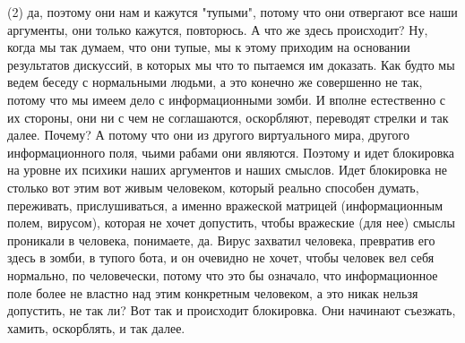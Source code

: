 (2) да, поэтому они нам и кажутся "тупыми", потому что они отвергают все наши
аргументы, они только кажутся, повторюсь. А что же здесь происходит? Ну, когда
мы так думаем, что они тупые, мы к этому приходим на основании результатов
дискуссий, в которых мы что то пытаемся им доказать. Как будто мы ведем беседу
с нормальными людьми, а это конечно же совершенно не так, потому что мы имеем
дело с информационными зомби. И вполне естественно с их стороны, они ни с чем
не соглашаются, оскорбляют, переводят стрелки и так далее. Почему? А потому что
они из другого виртуального мира, другого информационного поля, чьими рабами
они являются. Поэтому и идет блокировка на уровне их психики наших аргументов и
наших смыслов. Идет блокировка не столько вот этим вот живым человеком, который
реально способен думать, переживать, прислушиваться, а именно вражеской
матрицей (информационным полем, вирусом), которая не хочет допустить, чтобы
вражеские (для нее) смыслы проникали в человека, понимаете, да. Вирус захватил
человека, превратив его здесь в зомби, в тупого бота, и он очевидно не хочет,
чтобы человек вел себя нормально, по человечески, потому что это бы означало,
что информационное поле более не властно над этим конкретным человеком, а это
никак нельзя допустить, не так ли? Вот так и происходит блокировка. Они
начинают съезжать, хамить, оскорблять, и так далее.
